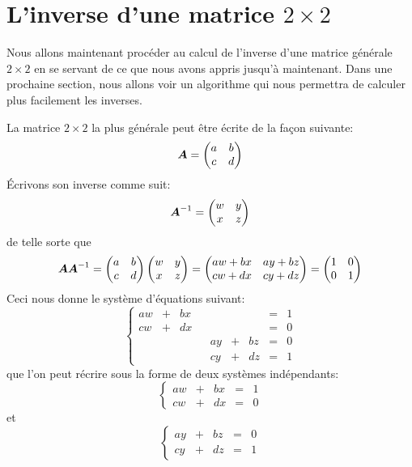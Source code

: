 \section{L'inverse d'une matrice $2\times 2$}

Nous allons maintenant procéder au calcul de l'inverse d'une matrice générale $2 \times 2$ en se servant
de ce que nous avons appris jusqu'à maintenant.  Dans une prochaine section,
nous allons voir un algorithme qui nous permettra de calculer plus facilement
les inverses.

La matrice $2\times 2$ la plus générale peut être écrite de la façon suivante:
\[
\boldsymbol{A} = \begin{pmatrix}
a & b \\
c & d
\end{pmatrix}
\]
Écrivons son inverse comme suit:
\[
\boldsymbol{A}^{-1} = \begin{pmatrix}
w & y \\
x & z
\end{pmatrix}
\]
de telle sorte que
\[
\boldsymbol{A}\boldsymbol{A}^{-1} = \begin{pmatrix}
a & b \\
c & d
\end{pmatrix}
\begin{pmatrix}
w & y \\
x & z
\end{pmatrix}
=
\begin{pmatrix}
aw + bx & ay + bz \\
cw + dx & cy + dz
\end{pmatrix}
=
\begin{pmatrix}
1 & 0 \\
0 & 1
\end{pmatrix}
\]
Ceci nous donne le système d'équations suivant:
	\[
	\left\{ \begin{matrix}
		aw &+& bx && && &=& 1\\
		cw &+& dx && && &=& 0 \\
		&& &&  ay &+& bz &=& 0\\
		&& &&  cy &+& dz &=& 1
		\end{matrix}\right.
	\]
que l'on peut récrire sous la forme de deux systèmes indépendants:
	\begin{equation}
	\left\{ \begin{matrix}
		aw &+& bx  &=& 1\\
		cw &+& dx  &=& 0 
		\end{matrix}\right. \label{inv2a}
	\end{equation}
et
	\begin{equation}
	\left\{ \begin{matrix}
		  ay &+& bz &=& 0\\
		  cy &+& dz &=& 1
		\end{matrix}\right. \label{inv2b}
	\end{equation}
